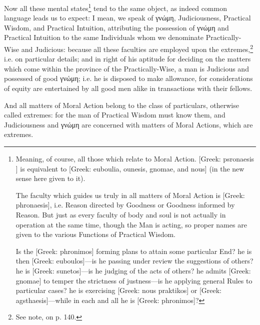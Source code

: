 Now all these mental states\footnote{Meaning, of course, all those which relate to Moral Action. [Greek: psronaesis
] is equivalent to [Greek: euboulia, ounesis, gnomae, and nous] (in the new
sense here given to it).

The faculty which guides us truly in all matters of Moral Action is [Greek:
phronaesis], i.e. Reason directed by Goodness or Goodness informed by Reason.
But just as every faculty of body and soul is not actually in operation at the
same time, though the Man is acting, so proper names are given to the various
Functions of Practical Wisdom.

Is the [Greek: phronimos] forming plans to attain some particular End? he
is then [Greek: euboulos]—is he passing under review the suggestions of
others? he is [Greek: sunetos]—is he judging of the acts of others? he
admits [Greek: gnomae] to temper the strictness of justness—is he
applying general Rules to particular cases? he is exercising [Greek: nous
praktikos] or [Greek: agsthaesis]—while in each and all he is [Greek:
phronimos]?}
tend to the same object, as indeed common language leads us to expect: I mean,
we speak of γνώμη, Judiciousness, Practical Wisdom,
and Practical Intuition, attributing the possession of
γνώμη and Practical Intuition to the same Individuals
whom we denominate Practically-Wise and Judicious: because all these faculties
are employed upon the extremes,\footnote{See note, on p. 140.}
i.e. on particular details; and in right of his aptitude for deciding on the
matters which come within the province of the Practically-Wise, a man is
Judicious and possessed of good γνώμη; i.e. he is
disposed to make allowance, for considerations of equity are entertained by all
good men alike in transactions with their fellows.

And all matters of Moral Action belong to the class of particulars, otherwise
called extremes: for the man of Practical Wisdom must know them, and
Judiciousness and γνώμη are concerned with matters of
Moral Actions, which are extremes.

